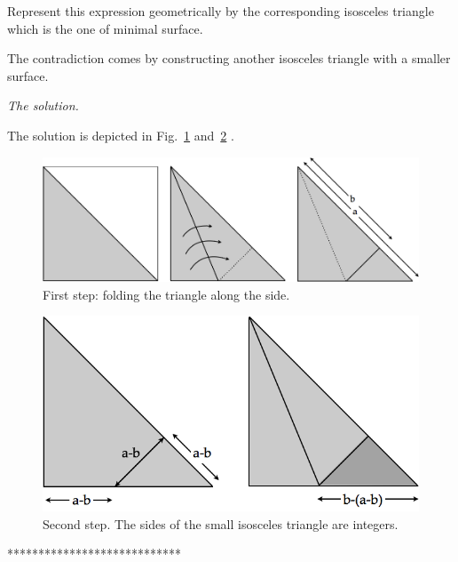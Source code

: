 {Represent this expression geometrically by the corresponding isosceles triangle
which is the one of minimal surface. 

The contradiction comes by constructing another isosceles triangle with a smaller surface.
\medskip

\noindent \textit{The solution.}

The solution is depicted in Fig.~\ref{Fig:sqrtbisInit} and~\ref{Fig:sqrtbisFin} . 
\begin{figure}
\begin{center}
        \includegraphics[scale=0.3]{FiguresArithmetic/sqrtbisInit}
        \caption{First step: folding the triangle along the side.}
        \label{Fig:sqrtbisInit}
\end{center}
\end{figure}
\begin{figure}
\begin{center}
        \includegraphics[scale=0.3]{FiguresArithmetic/sqrtbisFin}
        \caption{Second step. The sides of the small isosceles triangle are integers.}
        \label{Fig:sqrtbisFin}
\end{center}
\end{figure}
****************************}



